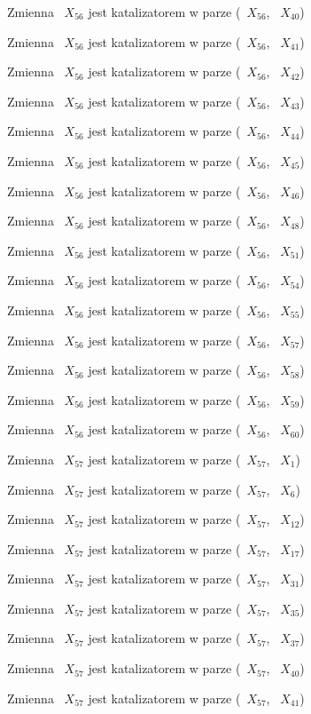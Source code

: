 \documentclass{article}
\begin{document}
Zmienna ~$X_{56}$ jest katalizatorem w parze (~$X_{56}$, ~$X_{40}$)

Zmienna ~$X_{56}$ jest katalizatorem w parze (~$X_{56}$, ~$X_{41}$)

Zmienna ~$X_{56}$ jest katalizatorem w parze (~$X_{56}$, ~$X_{42}$)

Zmienna ~$X_{56}$ jest katalizatorem w parze (~$X_{56}$, ~$X_{43}$)

Zmienna ~$X_{56}$ jest katalizatorem w parze (~$X_{56}$, ~$X_{44}$)

Zmienna ~$X_{56}$ jest katalizatorem w parze (~$X_{56}$, ~$X_{45}$)

Zmienna ~$X_{56}$ jest katalizatorem w parze (~$X_{56}$, ~$X_{46}$)

Zmienna ~$X_{56}$ jest katalizatorem w parze (~$X_{56}$, ~$X_{48}$)

Zmienna ~$X_{56}$ jest katalizatorem w parze (~$X_{56}$, ~$X_{51}$)

Zmienna ~$X_{56}$ jest katalizatorem w parze (~$X_{56}$, ~$X_{54}$)

Zmienna ~$X_{56}$ jest katalizatorem w parze (~$X_{56}$, ~$X_{55}$)

Zmienna ~$X_{56}$ jest katalizatorem w parze (~$X_{56}$, ~$X_{57}$)

Zmienna ~$X_{56}$ jest katalizatorem w parze (~$X_{56}$, ~$X_{58}$)

Zmienna ~$X_{56}$ jest katalizatorem w parze (~$X_{56}$, ~$X_{59}$)

Zmienna ~$X_{56}$ jest katalizatorem w parze (~$X_{56}$, ~$X_{60}$)

Zmienna ~$X_{57}$ jest katalizatorem w parze (~$X_{57}$, ~$X_{1}$)

Zmienna ~$X_{57}$ jest katalizatorem w parze (~$X_{57}$, ~$X_{6}$)

Zmienna ~$X_{57}$ jest katalizatorem w parze (~$X_{57}$, ~$X_{12}$)

Zmienna ~$X_{57}$ jest katalizatorem w parze (~$X_{57}$, ~$X_{17}$)

Zmienna ~$X_{57}$ jest katalizatorem w parze (~$X_{57}$, ~$X_{31}$)

Zmienna ~$X_{57}$ jest katalizatorem w parze (~$X_{57}$, ~$X_{35}$)

Zmienna ~$X_{57}$ jest katalizatorem w parze (~$X_{57}$, ~$X_{37}$)

Zmienna ~$X_{57}$ jest katalizatorem w parze (~$X_{57}$, ~$X_{40}$)

Zmienna ~$X_{57}$ jest katalizatorem w parze (~$X_{57}$, ~$X_{41}$)
\end{document}
